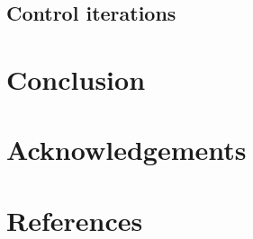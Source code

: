 \documentclass{../document}
\begin{document}
    \subsection{Control iterations}

  \section{Conclusion}

  \section*{Acknowledgements}

  \section*{References}

	  \printbibliography[heading=none]
  
\end{document}
